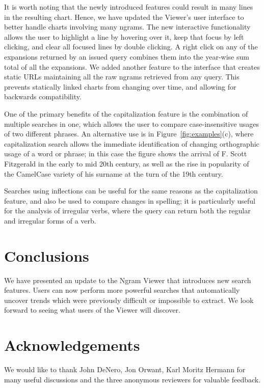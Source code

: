 \documentclass[11pt,a4paper]{article}
\begin{document}
It is worth noting that the newly introduced features could result in many lines in the resulting chart. Hence, we have updated the Viewer's user interface to better handle charts involving many ngrams. The new interactive functionality allows the user to highlight a line by hovering over it, keep that focus by left clicking, and clear all focused lines by double clicking. A right click on any of the expansions returned by an issued query combines them into the year-wise sum total of all the expansions. We added another feature to the interface that creates static URLs maintaining all the raw ngrams retrieved from any query. This prevents statically linked charts from changing over time, and allowing for backwards compatibility.

One of the primary benefits of the capitalization feature is the combination of multiple searches in one, which allows the user to compare case-insensitive usages of two different phrases. An alternative use is in Figure~\ref{fig:examples}(c), where capitalization search allows the immediate identification of changing orthographic usage of a word or phrase; in this case the figure shows the arrival of F. Scott Fitzgerald in the early to mid 20th century, as well as the rise in popularity of the CamelCase variety of his surname at the turn of the 19th century.

Searches using inflections can be useful for the same reasons as the capitalization feature, and also be used to compare changes in spelling; it is particularly useful for the analysis of irregular verbs, where the query can return both the regular and irregular forms of a verb.

\section{Conclusions}
We have presented an update to the Ngram Viewer that introduces new search features. Users can now perform more powerful searches that automatically uncover trends which were previously difficult or impossible to extract. We look forward to seeing what users of the Viewer will discover.

\section{Acknowledgements}
We would like to thank John DeNero, Jon Orwant, Karl Moritz Hermann for many useful discussions and the three anonymous reviewers for valuable feedback.
\end{document}
